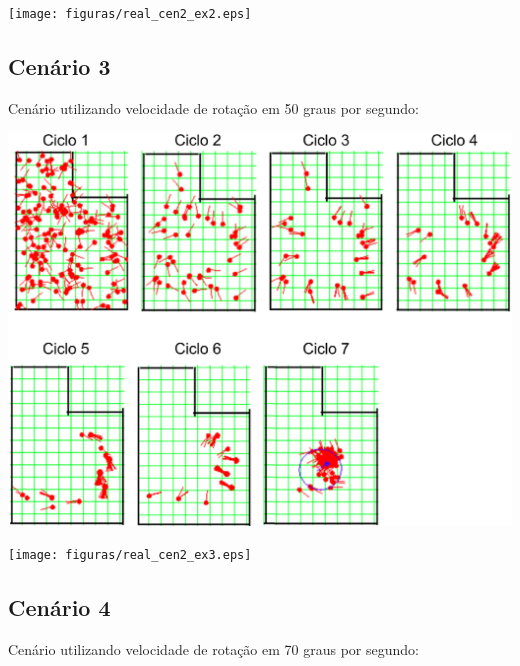 {\centering
\texttt{[image: figuras/real\_cen2\_ex2.eps]}
\label{img:real_cen2_ex2}
\par}

\subsection{Cenário 3}

Cenário utilizando velocidade de rotação em 50 graus por segundo:

{\centering
\includegraphics[scale=0.4]{figuras/cen2_ex3.eps}
\label{img:cen2_ex3}
\par}

{\centering
\texttt{[image: figuras/real\_cen2\_ex3.eps]}
\label{img:real_cen2_ex3}
\par}

\subsection{Cenário 4}

Cenário utilizando velocidade de rotação em 70 graus por segundo:


